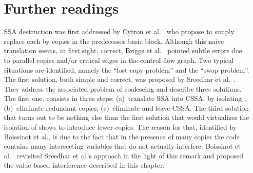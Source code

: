 
\section{Further readings}
SSA destruction was first addressed by Cytron et al.~\cite{Cytron:1991:TOPLAS} who propose to simply replace each \phifun by copies in the predecessor basic block. 
Although this naive translation seems, at first sight, correct, Briggs et al.~\cite{BriggsSSA} pointed subtle errors due to parallel copies and/or critical edges in the control-flow graph. 
Two typical situations are identified, namely the ``lost copy problem'' and the ``swap problem''. 
The first solution, both simple and correct, was proposed by Sreedhar et al.~\cite{Sreedhar:1999:SAS}. 
They address the associated problem of coalescing and describe three solutions. 
The first one, consists in three steps: 
(a)~translate SSA into CSSA, by isolating \phifuns; 
(b)~eliminate redundant copies; 
(c)~eliminate \phifuns and leave CSSA. 
The third solution that turns out to be nothing else than the first solution that would virtualizes the isolation of \phifuns shows to introduce fewer copies. 
The reason for that, identified by Boissinot et al., is due to the fact that in the presence of many copies the code contains many intersecting variables that do not actually interfere. 
Boissinot et al.~\cite{boissinot09revisiting} revisited Sreedhar et al.'s approach in the light of this remark and proposed the value based interference described in this chapter.

